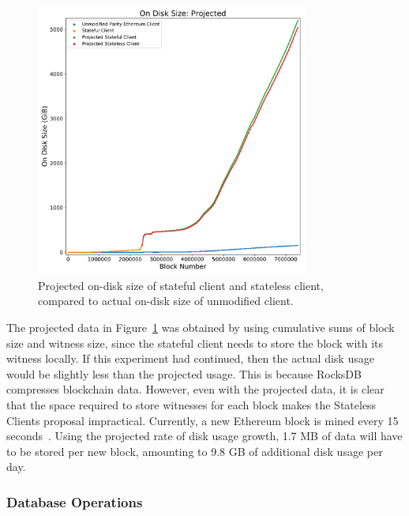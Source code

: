 \documentclass[12pt]{article}
\newcommand{\System}{Stateless Clients\xspace}
\newcommand{\figurewidth}{0.8\textwidth}
\begin{document}
\begin{figure}[H]
  \centering
  \includegraphics[width=\figurewidth]{../figures/results/graphs/background/projected-on-disk-size.pdf}
  \caption{Projected on-disk size of stateful client and stateless client, compared to actual on-disk size of unmodified client.}
  \label{fig:projectedondisksize}
\end{figure}

The projected data in Figure~\ref{fig:projectedondisksize} was obtained by using cumulative sums of block size and witness size, since the stateful client needs to store the block with its witness locally. If this experiment had continued, then the actual disk usage would be slightly less than the projected usage. This is because RocksDB compresses blockchain data. However, even with the projected data, it is clear that the space required to store witnesses for each block makes the \System proposal impractical. Currently, a new Ethereum block is mined every 15 seconds~\cite{ethereumblocktime}. Using the projected rate of disk usage growth, 1.7 MB of data will have to be stored per new block, amounting to 9.8 GB of additional disk usage per day.

\subsubsection{Database Operations} \label{subsubsection:iooperations}
\end{document}
